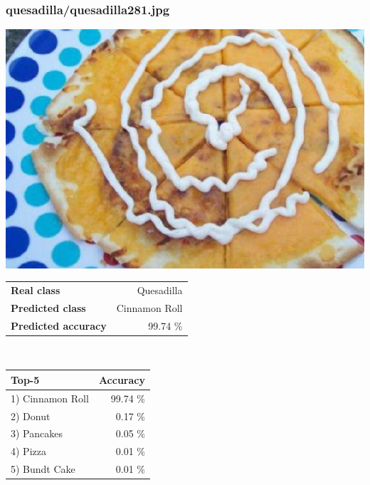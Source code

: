 \subsubsection{quesadilla/quesadilla281.jpg}

\begin{minipage}[t]{0.4\textwidth}
	\vspace{0pt}
	\includegraphics[width=\linewidth]{images/evaluation-images/quesadilla/quesadilla281.jpg}
\end{minipage}
\hfill
\begin{minipage}[t]{0.5\textwidth}
	\vspace{0pt}\raggedright
	\begin{tabularx}{\textwidth}{X r}
		\small \textbf{Real class} & \small Quesadilla\\
		\small \textbf{Predicted class} & \small Cinnamon Roll\\
		\small \textbf{Predicted accuracy} & \small 99.74 \%
    \end{tabularx}\\
    
    \vspace{6pt}
	\begin{tabularx}{\textwidth}{X r}
        \small \textbf{Top-5} & \small \textbf{Accuracy} \\
        \hline
		\small 1) Cinnamon Roll & \small 99.74 \%\\\small 2) Donut & \small 0.17 \%\\\small 3) Pancakes & \small 0.05 \%\\\small 4) Pizza & \small 0.01 \%\\\small 5) Bundt Cake & \small 0.01 \%
    \end{tabularx}
\end{minipage}
    
